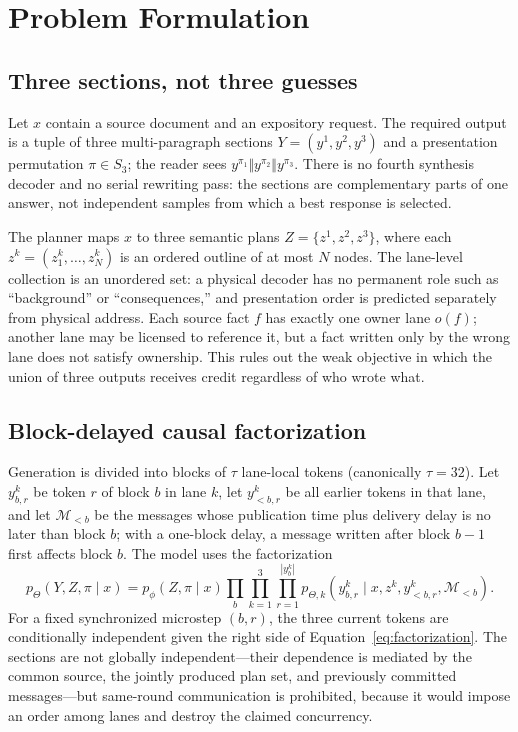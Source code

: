 \documentclass[10pt]{article}
\newcommand{\M}{\mathcal{M}}
\begin{document}
\section{Problem Formulation}
\label{sec:formulation}

\subsection{Three sections, not three guesses}

Let \(x\) contain a source document and an expository request. The required
output is a tuple of three multi-paragraph sections
\(
Y=(y^{1},y^{2},y^{3})
\)
and a presentation permutation \(\pi\in S_3\); the reader sees
\(
y^{\pi_1}\Vert y^{\pi_2}\Vert y^{\pi_3}
\).
There is no fourth synthesis decoder and no serial rewriting pass: the
sections are complementary parts of one answer, not independent samples from
which a best response is selected.

The planner maps \(x\) to three semantic plans \(Z=\{z^1,z^2,z^3\}\), where
each \(z^k=(z^k_1,\ldots,z^k_N)\) is an ordered outline of at most \(N\)
nodes. The lane-level collection is an unordered set: a physical decoder has
no permanent role such as ``background'' or ``consequences,'' and
presentation order is predicted separately from physical address. Each source
fact \(f\) has exactly one owner lane \(o(f)\); another lane may be licensed
to reference it, but a fact written only by the wrong lane does not satisfy
ownership. This rules out the weak objective in which the union of three
outputs receives credit regardless of who wrote what.

\subsection{Block-delayed causal factorization}

Generation is divided into blocks of \(\tau\) lane-local tokens (canonically
\(\tau=32\)). Let \(y^k_{b,r}\) be token \(r\) of block \(b\) in lane \(k\),
let \(y^k_{<b,r}\) be all earlier tokens in that lane, and let \(\M_{<b}\) be
the messages whose publication time plus delivery delay is no later than
block \(b\); with a one-block delay, a message written after block \(b-1\)
first affects block \(b\). The model uses the factorization
\begin{equation}
\label{eq:factorization}
p_\Theta(Y,Z,\pi\mid x)
=p_\phi(Z,\pi\mid x)
\prod_{b}
\prod_{k=1}^{3}
\prod_{r=1}^{|y^k_b|}
p_{\Theta,k}\!\left(
y^k_{b,r}
\mid x,z^k,y^k_{<b,r},\M_{<b}
\right).
\end{equation}
For a fixed synchronized microstep \((b,r)\), the three current tokens are
conditionally independent given the right side of
Equation~\ref{eq:factorization}. The sections are not globally
independent---their dependence is mediated by the common source, the jointly
produced plan set, and previously committed messages---but same-round
communication is prohibited, because it would impose an order among lanes and
destroy the claimed concurrency.
\end{document}
